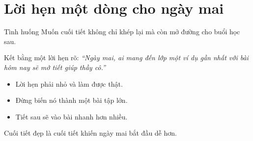 \section{Lời hẹn một dòng cho ngày mai}
\begin{tinhhuong}{Tình huống}
Muốn cuối tiết không chỉ khép lại mà còn mở đường cho buổi học sau.
\end{tinhhuong}
\begin{goiydungngay}
Kết bằng một lời hẹn rõ: \textit{``Ngày mai, ai mang đến lớp một ví dụ gần nhất với bài hôm nay sẽ mở tiết giúp thầy cô.''}
\begin{itemize}
\item Lời hẹn phải nhỏ và làm được thật.
\item Đừng biến nó thành một bài tập lớn.
\item Tiết sau sẽ vào bài nhanh hơn nhiều.
\end{itemize}
\end{goiydungngay}
\begin{cauchot}
Cuối tiết đẹp là cuối tiết khiến ngày mai bắt đầu dễ hơn.
\end{cauchot}
